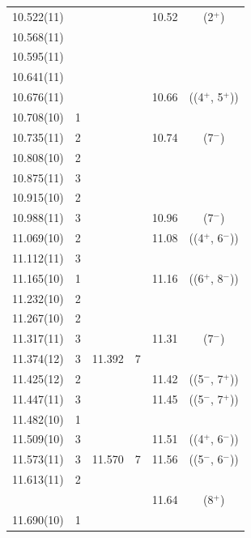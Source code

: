{\begin{center}
\begin{longtable}{cc cc cc}
  10.522(11)    &   &   &   & 10.52 & (2$^+$)                 \\
10.568(11)  &   &   &   &   &                         \\
  10.595(11)    &   &   &   &   &                         \\
     10.641(11)   &   &   &   &   &                         \\
     10.676(11)   &   &   &   & 10.66 & ((4$^+$, 5$^+$))        \\
     10.708(10)   & 1 &   &   &   &                         \\
     10.735(11)   & 2 &   &   & 10.74 & (7$^-$)                 \\
     10.808(10)   & 2 &   &   &   &   \\
     10.875(11)   & 3 &   &   &   &   \\
     10.915(10)   & 2 &   &   &   &   \\
   10.988(11)     & 3 &   &   & 10.96 & (7$^-$)                   \\
    11.069(10)    & 2 &   &   & 11.08 & ((4$^+$, 6$^-$))          \\
     11.112(11)   & 3 &   &   &   &                           \\
    11.165(10)    & 1 &   &   & 11.16 & ((6$^+$, 8$^-$))          \\
    11.232(10)    & 2 &   &   &   &                           \\
    11.267(10)    & 2 &   &   &   &                           \\
    11.317(11)    & 3 &   &   & 11.31 & (7$^-$)                   \\
    11.374(12)    & 3 & 11.392  & 7 &   &                           \\
    11.425(12)    & 2 &   &   & 11.42 & ((5$^-$, 7$^+$))          \\
    11.447(11)    & 3 &   &   & 11.45  & ((5$^-$, 7$^+$))            \\
    11.482(10)    & 1 &   &   &   &                           \\
    11.509(10)    & 3 &   &   & 11.51 & ((4$^+$, 6$^-$))          \\
     11.573(11)   & 3 & 11.570  & 7 & 11.56 & ((5$^-$, 6$^-$))          \\
     11.613(11)   & 2 &   &   &   &                           \\
  &   &   &   & 11.64 & (8$^+$)                   \\
   11.690(10)     & 1 &   &   &   &                           \\

\end{longtable}
\end{center}}
